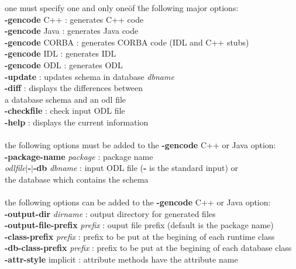 \begin{tabbing}
one must specify one and only one\= of \=the following major options:\\
{\bf -gencode} C++                 \>: generates C++ code\\
{\bf -gencode} Java                \>: generates Java code\\
{\bf -gencode} CORBA               \>: generates CORBA code (IDL and C++ stubs)\\
{\bf -gencode} IDL                 \>: generates IDL\\
{\bf -gencode} ODL                 \>: generates ODL\\
{\bf -update}                      \>: updates schema in database \emph{dbname}\\
{\bf -diff}                        \>: displays the differences between\\
                             \>\> a database schema and an odl file\\
{\bf -checkfile}                   \>: check input ODL file\\
{\bf -help}                        \>: displays the current information\\
\\
the following options must be added to the {\bf -gencode} C++ or Java option:\\
{\bf -package-name} \emph{package}      \>: package name\\
\emph{odlfile}$|${\bf -$|$-db} \emph{dbname} \>: input ODL file ({\bf -} is the standard input) or\\
                             \>\> the database which contains the schema\\
\\
the following options can be added to the {\bf -gencode} C++ or Java option:\\
{\bf -output-dir} \emph{dirname}        \>: output directory for generated files\\
{\bf -output-file-prefix} \emph{prefix} \>: ouput file prefix (default is the package name)\\
{\bf -class-prefix} \emph{prefix}       \>: prefix to be put at the begining of each runtime class\\
{\bf -db-class-prefix} \emph{prefix}    \>: prefix to be put at the begining of each database class\\
{\bf -attr-style} implicit         \>: attribute methods have the attribute name\\

\end{tabbing}

